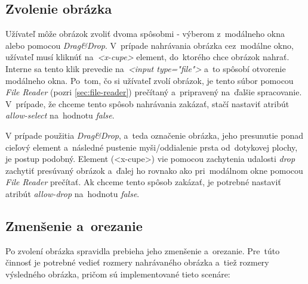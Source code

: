 \subsection{Zvolenie obrázka}

Užívateľ môže obrázok zvoliť dvoma spôsobmi - výberom z~modálneho okna alebo pomocou \emph{Drag\&Drop}. V~prípade nahrávania obrázka cez~modálne okno, užívateľ musí kliknúť na~\emph{<x-cupe>} element, do~ktorého chce obrázok nahrať. Interne sa tento klik prevedie na~\emph{<input type="file"\textgreater} a~to spôsobí otvorenie modálneho okna. Po~tom, čo si užívateľ zvolí obrázok, je tento súbor pomocou \emph{File Reader} (pozri \ref{sec:file-reader}) prečítaný a~pripravený na~ďalšie spracovanie. V~prípade, že chceme tento spôsob nahrávania zakázať, stačí nastaviť atribút \emph{allow-select} na~hodnotu \emph{false}.

V prípade použitia \emph{Drag\&Drop}, a~teda označenie obrázka, jeho presunutie ponad cieľový element a~následné pustenie myši/oddialenie prsta od~dotykovej plochy, je postup podobný. Element (<x-cupe>) vie pomocou zachytenia udalosti \emph{drop} zachytiť presúvaný obrázok a~ďalej ho rovnako ako pri~modálnom okne pomocou \emph{File Reader} prečítať. Ak chceme tento spôsob zakázať, je potrebné nastaviť atribút \emph{allow-drop} na~hodnotu \emph{false}.

\subsection{Zmenšenie a~orezanie}

Po zvolení obrázka spravidla prebieha jeho zmenšenie a~orezanie. Pre~túto činnosť je potrebné vedieť rozmery nahrávaného obrázka a~tiež rozmery výsledného obrázka, pričom sú implementované tieto scenáre:

